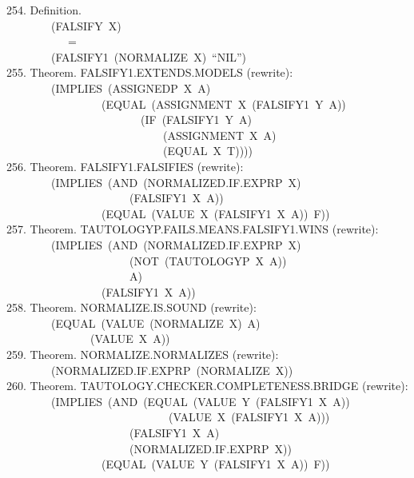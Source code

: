 \documentclass[10pt]{book}
\newenvironment{pubasis}{\begin{flushleft}}{\end{flushleft}}
\begin{document}
\begin{pubasis}
254.    Definition.\\
~~~~~~~~(FALSIFY~X)\\
~~~~~~~~~~~=\\
~~~~~~~~(FALSIFY1~(NORMALIZE~X)~``NIL'')\\

255.    Theorem.  FALSIFY1.EXTENDS.MODELS (rewrite):\\
~~~~~~~~(IMPLIES~(ASSIGNEDP~X~A)\\
~~~~~~~~~~~~~~~~~(EQUAL~(ASSIGNMENT~X~(FALSIFY1~Y~A))\\
~~~~~~~~~~~~~~~~~~~~~~~~(IF~(FALSIFY1~Y~A)\\
~~~~~~~~~~~~~~~~~~~~~~~~~~~~(ASSIGNMENT~X~A)\\
~~~~~~~~~~~~~~~~~~~~~~~~~~~~(EQUAL~X~T))))\\

256.    Theorem.  FALSIFY1.FALSIFIES (rewrite):\\
~~~~~~~~(IMPLIES~(AND~(NORMALIZED.IF.EXPRP~X)\\
~~~~~~~~~~~~~~~~~~~~~~(FALSIFY1~X~A))\\
~~~~~~~~~~~~~~~~~(EQUAL~(VALUE~X~(FALSIFY1~X~A))~F))\\

257.    Theorem.  TAUTOLOGYP.FAILS.MEANS.FALSIFY1.WINS (rewrite):\\
~~~~~~~~(IMPLIES~(AND~(NORMALIZED.IF.EXPRP~X)\\
~~~~~~~~~~~~~~~~~~~~~~(NOT~(TAUTOLOGYP~X~A))\\
~~~~~~~~~~~~~~~~~~~~~~A)\\
~~~~~~~~~~~~~~~~~(FALSIFY1~X~A))\\

258.    Theorem.  NORMALIZE.IS.SOUND (rewrite):\\
~~~~~~~~(EQUAL~(VALUE~(NORMALIZE~X)~A)\\
~~~~~~~~~~~~~~~(VALUE~X~A))\\

259.    Theorem.  NORMALIZE.NORMALIZES (rewrite):\\
~~~~~~~~(NORMALIZED.IF.EXPRP~(NORMALIZE~X))\\

260.    Theorem.  TAUTOLOGY.CHECKER.COMPLETENESS.BRIDGE (rewrite):\\
~~~~~~~~(IMPLIES~(AND~(EQUAL~(VALUE~Y~(FALSIFY1~X~A))\\
~~~~~~~~~~~~~~~~~~~~~~~~~~~~~(VALUE~X~(FALSIFY1~X~A)))\\
~~~~~~~~~~~~~~~~~~~~~~(FALSIFY1~X~A)\\
~~~~~~~~~~~~~~~~~~~~~~(NORMALIZED.IF.EXPRP~X))\\
~~~~~~~~~~~~~~~~~(EQUAL~(VALUE~Y~(FALSIFY1~X~A))~F))\\


\end{pubasis}
\end{document}
